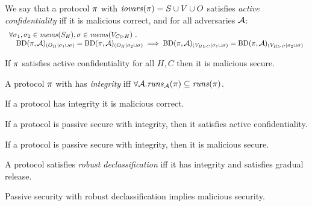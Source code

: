 \begin{definition}
  We say that a protocol $\pi$ with $\mathit{iovars}(\pi) = S \cup V \cup O$ satisfies
  \emph{active confidentiality} iff
  it is malicious correct, and for all adversaries $\mathcal{A}$:
    $$\begin{array}[t]{l}\forall \sigma_1, \sigma_2 \in \mathit{mems}(S_H), \sigma \in \mathit{mems}(V_{C \rhd H})\ . \\
    \quad
    \mathrm{BD}(\pi,\mathcal{A})_{({O_H}|{\sigma_1 \cup \sigma})} =
    \mathrm{BD}(\pi,\mathcal{A})_{({O_H}|{\sigma_2 \cup \sigma})} 
    \implies
    \mathrm{BD}(\pi,\mathcal{A})_{({V_{H \rhd C}}|{\sigma_1 \cup \sigma})} =
    \mathrm{BD}(\pi,\mathcal{A})_{({V_{H \rhd C}}|{\sigma_2 \cup \sigma})}
    \end{array}$$
\end{definition}

\begin{theorem}
  If $\pi$ satisfies active confidentiality for all $H,C$ then it is malicious secure.
\end{theorem}

\begin{definition}
  A protocol $\pi$ with has \emph{integrity} iff 
  $\forall \mathcal{A} . \mathit{runs}_{\mathcal{A}}(\pi) \subseteq \mathit{runs}(\pi)$.
\end{definition}

\begin{theorem}
  If a protocol has integrity it is malicious correct.
\end{theorem}

\begin{theorem}
  If a protocol is passive secure with integrity, then it satisfies active confidentiality.
\end{theorem}

\begin{theorem}
  If a protocol is passive secure with integrity, then it is malicious secure.
\end{theorem}

\begin{definition}
  A protocol satisfies \emph{robust declassification} iff it has integrity and
  satisfies gradual release. 
\end{definition}

\begin{theorem}
  Passive security with robust declassification implies malicious security.
\end{theorem}
